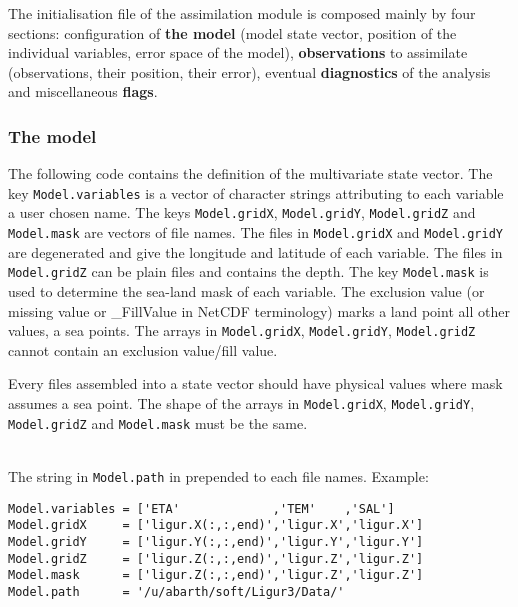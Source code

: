 \documentclass[a4paper,12pt]{article}
\newcommand{\code}{\texttt}
\begin{document}
The initialisation file of the assimilation module is composed mainly
by four sections: configuration of \textbf{the model} (model state vector,
position of the individual variables, error space of the model),
\textbf{observations} to assimilate (observations, their position, their
error), eventual \textbf{diagnostics} of the analysis and
miscellaneous \textbf{flags}.

\subsubsection{The model}

The following code contains the definition of the multivariate state
vector. The key \code{Model.variables} is a vector of character
strings attributing to each variable a user chosen name. The keys
\code{Model.gridX}, \code{Model.gridY}, \code{Model.gridZ} and
\code{Model.mask} are vectors of file names. The files in \code{Model.gridX} and 
\code{Model.gridY} are degenerated and give the longitude and latitude
of each variable. The files in \code{Model.gridZ} can be plain files
and contains the depth. The key \code{Model.mask} is used to determine
the sea-land mask of each variable. The exclusion value (or missing
value or \_FillValue in NetCDF terminology) marks a land point all other values, a sea
points. The arrays in \code{Model.gridX}, \code{Model.gridY}, \code{Model.gridZ} cannot 
contain an exclusion value/fill value.

Every files assembled into a state vector should have physical
values where mask assumes a sea point. The shape of the arrays in
\code{Model.gridX}, \code{Model.gridY}, \code{Model.gridZ} and
\code{Model.mask} must be the same. 


\\

The string in \code{Model.path} in prepended to each file names.
Example:


\begin{verbatim}
Model.variables = ['ETA'             ,'TEM'    ,'SAL'] 
Model.gridX     = ['ligur.X(:,:,end)','ligur.X','ligur.X'] 
Model.gridY     = ['ligur.Y(:,:,end)','ligur.Y','ligur.Y'] 
Model.gridZ     = ['ligur.Z(:,:,end)','ligur.Z','ligur.Z'] 
Model.mask      = ['ligur.Z(:,:,end)','ligur.Z','ligur.Z'] 
Model.path      = '/u/abarth/soft/Ligur3/Data/' 
\end{verbatim}
\end{document}
